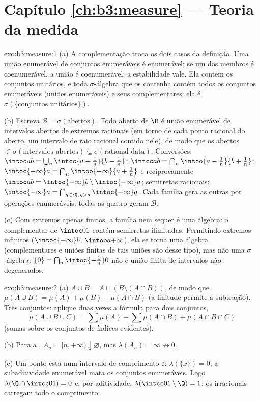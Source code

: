 \section*{Capítulo \ref{ch:b3:measure} --- Teoria da medida}

\begin{solution}{exo:b3:measure:1}
(a) A complementação troca os dois casos da definição. Uma união
enumerável de conjuntos enumeráveis é enumerável; se um dos membros é
coenumerável, a união é coenumerável: a estabilidade vale. Ela
contém os conjuntos unitários, e toda $\sigma$-álgebra que os contenha
contém todos os conjuntos enumeráveis (uniões enumeráveis) e seus
complementares: ela é $\sigma(\{\text{conjuntos unitários}\})$.

(b) Escreva $\mathcal B = \sigma(\text{abertos})$. Todo aberto
de $\R$ é união enumerável de intervalos abertos de
extremos racionais (em torno de cada ponto racional do aberto,
um intervalo de raio racional contido nele), de modo que os abertos $\in
\sigma(\text{intervalos abertos}) \subseteq \sigma(\text{rational
data})$. Conversões: $\intoo ab = \bigcup_n\intcc{a +
\frac1n}{b - \frac1n}$; $\intcc ab = \bigcap_n \intoo{a -
\frac1n}{b + \frac1n}$; $\intoc{-\infty}a = \bigcap_n
\intoo{-\infty}{a + \frac1n}$ e reciprocamente $\intoo ab =
\intoo{-\infty}b \setminus \intoc{-\infty}a$; semirretas racionais:
$\intoc{-\infty}a =
\bigcap_{q \in \Q,\, q > a}\intoc{-\infty}q$. Cada família
gera as outras por operações enumeráveis: todas as quatro geram
$\mathcal B$.

(c) Com extremos apenas finitos, a família nem sequer é uma
álgebra: o complementar de $\intoc01$ contém semirretas ilimitadas.
Permitindo extremos infinitos ($\intoc{-\infty}b$, $\intoo
a{+\infty}$), ela se torna uma álgebra (complementares e uniões
finitas de tais uniões são desse tipo), mas não uma $\sigma$-álgebra:
$\{0\} = \bigcap_n\intoc{-\frac1n}0$ não é união finita de
intervalos não degenerados.
\end{solution}

\begin{solution}{exo:b3:measure:2}
(a) $A \cup B = A \sqcup (B \setminus (A\cap B))$, de modo que
$\mu(A\cup B) = \mu(A) + \mu(B) - \mu(A\cap B)$ (a finitude
permite a subtração). Três conjuntos: aplique duas vezes a fórmula
para dois conjuntos,
\[
\mu(A\cup B\cup C) = \sum\mu(A) - \sum\mu(A\cap B) +
\mu(A\cap B\cap C)
\]
(somas sobre os conjuntos de índices evidentes).

(b) Para a , $A_n = [n, +\infty) \downarrow
\varnothing$, mas $\lambda(A_n) = \infty \not\to 0$.

(c) Um ponto está num intervalo de comprimento $\varepsilon$:
$\lambda(\{x\}) = 0$; a subaditividade enumerável mata os conjuntos
enumeráveis. Logo $\lambda(\Q \cap \intcc01) = 0$ e, por aditividade,
$\lambda(\intcc01\setminus\Q) = 1$: os irracionais carregam todo
o comprimento.
\end{solution}

